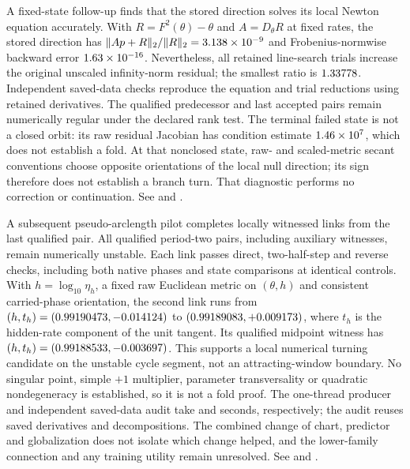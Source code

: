 \documentclass[11pt,letterpaper]{article}
\begin{document}
A fixed-state follow-up finds that the stored direction solves its local Newton equation accurately.
With $R=F^2(\theta)-\theta$ and $A=D_\theta R$ at fixed rates,
the stored direction has $\|Ap+R\|_2/\|R\|_2=3.138\times10^{-9}$ and Frobenius-normwise
backward error $1.63\times10^{-16}$. Nevertheless, all \nSOneRGapTrials{} retained line-search trials
increase the original unscaled infinity-norm residual; the smallest ratio is $1.33778$.
Independent saved-data checks reproduce the equation and trial reductions using retained derivatives. The qualified predecessor
and last accepted pairs remain numerically regular under the declared rank test.
The terminal failed state is not a closed orbit: its raw residual Jacobian has condition estimate
$1.46\times10^{7}$, which does not establish a fold. At that nonclosed state, raw- and scaled-metric secant conventions choose opposite
orientations of the local null direction; its sign therefore does not establish a branch turn. That diagnostic performs no correction or continuation. See
 and
.

A subsequent pseudo-arclength pilot completes \nSOneRPALLinks{} locally witnessed links from the last qualified pair.
All \nSOneRPALPairs{} qualified period-two pairs, including \nSOneRPALAux{} auxiliary witnesses,
remain numerically unstable. Each link passes direct, two-half-step and reverse checks, including
both native phases and state comparisons at identical controls. With $h=\log_{10}\eta_h$, a fixed raw Euclidean
metric on $(\theta,h)$ and consistent carried-phase orientation, the second link runs from
$(h,t_h)=(0.99190473,-0.014124)$ to
$(0.99189083,+0.009173)$, where $t_h$ is the hidden-rate component of the unit tangent.
Its qualified midpoint witness has $(h,t_h)=(0.99188533,-0.003697)$.
This supports a local numerical turning candidate on the unstable cycle segment, not an attracting-window boundary.
No singular point, simple $+1$ multiplier, parameter transversality or quadratic nondegeneracy is established, so it is not a fold proof.
The one-thread producer and independent saved-data audit take \xSOneRPALSeconds{} and
\xSOneRPALAuditSeconds{} seconds, respectively; the audit reuses saved derivatives and decompositions.
The combined change of chart, predictor and globalization does not isolate which change helped, and the
lower-family connection and any training utility remain unresolved. See
 and
.
\end{document}
